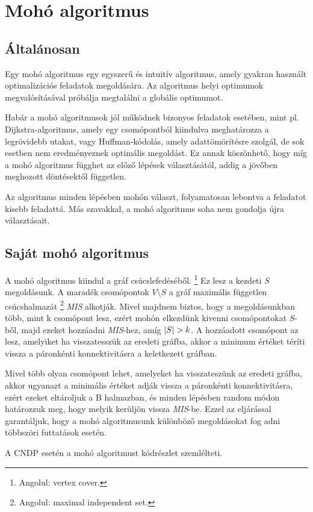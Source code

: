 \section{Mohó algoritmus}\label{sec:MOHO_ALGORITMUS}

\subsection{Általánosan}
Egy mohó algoritmus egy egyszerű és intuitív algoritmus, amely gyakran használt
optimalizációs feladatok megoldására. Az algoritmus helyi optimumok megvalósításával próbálja
megtalálni a globális optimumot.

Habár a mohó algoritmusok jól működnek bizonyos feladatok esetében,
mint pl. Dijkstra-algoritmus, amely egy csomópontból kiindulva meghatározza a legrövidebb utakat,
vagy Huffman-kódolás, amely adattömörítésre szolgál, de sok esetben nem eredményeznek optimális megoldást.
Ez annak köszönhető, hogy míg a mohó algoritmus függhet az előző lépések választásától,
addig a jövőben meghozott döntésektől független.

Az algoritmus minden lépésben mohón választ, folyamatosan lebontva a feladatot kisebb feladattá.
Más szavakkal, a mohó algoritmus soha nem gondolja újra választásait.

\subsection{Saját mohó algoritmus}
A mohó algoritmus kiindul a gráf csúcslefedéséből.
\footnote{
  Angolul: vertex cover.
}
Ez lesz a kezdeti $S$ megoldásunk.
A maradék csomópontok $V \setminus S$  a gráf maximális független csúcshalmazát
\footnote{
  Angolul: maximal independent set.
}
\emph{MIS} alkotják.
Mivel majdnem biztos, hogy a megoldásunkban több, mint k csomópont lesz, ezért mohón elkezdünk kivenni csomópontokat $S$-ből,
majd ezeket hozzáadni \emph{MIS}-hez, amíg $\lvert S\rvert > k$.
A hozzáadott csomópont az lesz, amelyiket ha visszatesszük az eredeti gráfba,
akkor a minimum értéket téríti vissza a páronkénti konnektivitásra a keletkezett gráfban.

Mivel több olyan csomópont lehet, amelyeket ha visszateszünk az eredeti gráfba,
akkor ugyanazt a minimális értéket adják vissza a páronkénti konnektivitásra,
ezért ezeket eltároljuk a B halmazban, és minden lépésben random módon határozzuk meg,
hogy melyik kerüljön vissza \emph{MIS}-be. Ezzel az eljárással garantáljuk,
hogy a mohó algoritmusunk különböző megoldásokat fog adni többszöri futtatások esetén.

A CNDP esetén a mohó algoritmust  kódrészlet szemlélteti.

